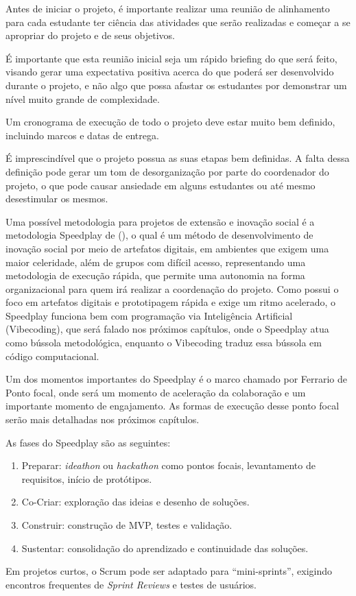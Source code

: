 Antes de iniciar o projeto, é importante realizar uma reunião de alinhamento para cada estudante ter ciência das atividades que serão realizadas e começar a se apropriar do projeto e de seus objetivos.

É importante que esta reunião inicial seja um rápido briefing do que será feito, visando gerar uma expectativa positiva acerca do que poderá ser desenvolvido durante o projeto, e não algo que possa afastar os estudantes por demonstrar um nível muito grande de complexidade.

Um cronograma de execução de todo o projeto deve estar muito bem definido, incluindo marcos e datas de entrega.

É imprescindível que o projeto possua as suas etapas bem definidas. A falta dessa definição pode gerar um tom de desorganização por parte do coordenador do projeto, o que pode causar ansiedade em alguns estudantes ou até mesmo desestimular os mesmos. 

Uma possível metodologia para projetos de extensão e inovação social é a metodologia Speedplay de \citeauthor{ferrario2014} (\citeyear{ferrario2014}), o qual é um método de desenvolvimento de inovação social por meio de artefatos digitais, em ambientes que exigem uma maior celeridade, além de grupos com difícil acesso, representando uma metodologia de execução rápida, que permite uma autonomia na forma organizacional para quem irá realizar a coordenação do projeto. Como possui o foco em artefatos digitais e prototipagem rápida e exige um ritmo acelerado, o Speedplay funciona bem com programação via Inteligência Artificial (Vibecoding), que será falado nos próximos capítulos, onde o Speedplay atua como bússola metodológica, enquanto o Vibecoding traduz essa bússola em código computacional. 

Um dos momentos importantes do Speedplay é o marco chamado por Ferrario de Ponto focal, onde será um momento de aceleração da colaboração e um importante momento de engajamento. As formas de execução desse ponto focal serão mais detalhadas nos próximos capítulos.

As fases do Speedplay são as seguintes:

\begin{enumerate}
    \item Preparar: \textit{ideathon} ou \textit{hackathon} como pontos focais, levantamento de requisitos, início de protótipos.
    \item Co-Criar: exploração das ideias e desenho de soluções.
    \item Construir: construção de MVP, testes e validação.
    \item Sustentar: consolidação do aprendizado e continuidade das soluções.
\end{enumerate}

Em projetos curtos, o Scrum pode ser adaptado para “mini-sprints”, exigindo encontros frequentes de \textit{Sprint Reviews} e testes de usuários.


